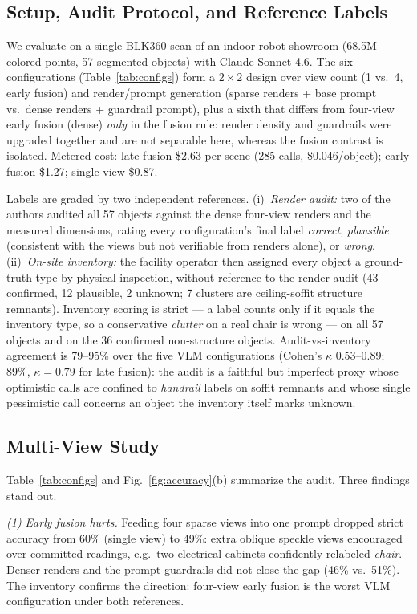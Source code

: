 \documentclass[conference]{IEEEtran}
\begin{document}
\subsection{Setup, Audit Protocol, and Reference Labels}
\label{sec:setup}
We evaluate on a single BLK360 scan of an indoor robot showroom (68.5M
colored points, 57 segmented objects) with Claude Sonnet 4.6. The six
configurations (Table~\ref{tab:configs}) form a $2\times2$ design over
view count (1 vs.\ 4, early fusion) and render/prompt generation (sparse
renders + base prompt vs.\ dense renders + guardrail prompt), plus a sixth
that differs from four-view early fusion (dense) \emph{only} in the
fusion rule: render density and guardrails were upgraded together and are
not separable here, whereas the fusion contrast is isolated. Metered
cost: late fusion \$2.63 per scene (285 calls, \$0.046/object); early
fusion \$1.27; single view \$0.87.

Labels are graded by two independent references. (i)~\emph{Render
audit:} two of the authors audited all 57 objects against the dense
four-view renders and the measured dimensions, rating every
configuration's final label \emph{correct}, \emph{plausible} (consistent
with the views but not verifiable from renders alone), or \emph{wrong}.
(ii)~\emph{On-site inventory:} the facility operator then assigned every
object a ground-truth type by physical inspection, without reference to
the render audit (43 confirmed, 12 plausible, 2 unknown; 7 clusters are
ceiling-soffit structure remnants). Inventory scoring is strict --- a
label counts only if it equals the inventory type, so a conservative
\emph{clutter} on a real chair is wrong --- on all 57 objects and on the
36 confirmed non-structure objects. Audit-vs-inventory agreement is
79--95\% over the five VLM configurations (Cohen's $\kappa$ 0.53--0.89;
89\%, $\kappa=0.79$ for late fusion): the audit is a faithful but
imperfect proxy whose optimistic calls are confined to \emph{handrail}
labels on soffit remnants and whose single pessimistic call concerns an
object the inventory itself marks unknown.

\subsection{Multi-View Study}
\label{sec:study}
Table~\ref{tab:configs} and Fig.~\ref{fig:accuracy}(b) summarize the
audit. Three findings stand out.

\emph{(1) Early fusion hurts.} Feeding four sparse views into one prompt
dropped strict accuracy from 60\% (single view) to 49\%: extra oblique
speckle views encouraged over-committed readings, e.g.\ two electrical
cabinets confidently relabeled \emph{chair}. Denser renders and the prompt
guardrails did not close the gap (46\% vs.\ 51\%). The inventory confirms
the direction: four-view early fusion is the worst VLM configuration under
both references.
\end{document}
